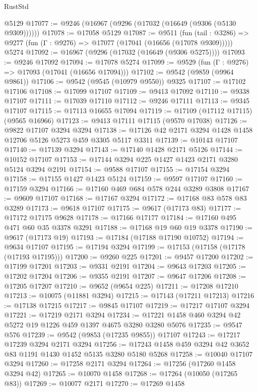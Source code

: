 \begin{lexlean}{RustStd}
\begin{coremodule}
    @5129
@17077 := @9246 (@16967 (@9296 (@17032 (@16649 (@9306 (@5130 @9309))))))
@17078 := @17058 @5129
@17087 := @9511
    (fun (tail : @3286) => @9277 (fun (Γ : @9276) => @17077 (@17041 (@16656 (@17078 @9309)))))
    @5274
@17092 := @16967 (@9296 (@17032 (@16649 (@9306 @5275))))
@17093 := @9246 @17092
@17094 := @17078 @5274
@17099 := @9529 (fun (Γ : @9276) => @17093 (@17041 (@16656 @17094)))
@17102 := @9542 (@9859 (@9964 @9861))
@17106 := @9542 (@9545 (@10979 @9550)) @9325
@17107 := @17102 @17106
@17108 := @17099 @17107
@17109 := @9413 @17092
@17110 := @9338 @17107
@17111 := @17039 @17110
@17112 := @9246 @17111
@17113 := @9345 @17107
@17115 := @17113 @16655 @17094
@17119 := @17109 (@17112 @17115) (@9565 @16966)
@17123 := @9413 @17111 @17115 (@9570 @17038)
@17126 := @9822 @17107 @3294 @3294
@17138 := @17126 @42 @2171 @3294 @1428 @1458 @12706 @5126 @5273 @459 @3305 @5117 @3311
@17139 := @10143 @17107
@17140 := @17139 @3294
@17143 := @17140 @1428 @2171 @5126
@17144 := @10152 @17107
@17153 := @17144 @3294 @225 @1427 @1423 @2171 @3280 @5124 @3294 @2191
@17154 := @9588 @17107
@17155 := @17154 @3294
@17158 := @17155 @1427 @1423 @5124
@17159 := @9597 @17107
@17160 := @17159 @3294
@17166 := @17160 @469 @684 @578 @244 @3289 @3808
@17167 := @9609 @17107
@17168 := @17167 @3294
@17172 := @17168 @83 @578 @83 @3289
@17173 := @9618 @17107
@17175 := @9617 (@17173 @83)
@17177 := @17172 @17175 @9628
@17178 := @17166 @17177
@17184 := @17160 @495 @471 @60 @35 @3378 @3291
@17188 := @17168 @19 @60 @19 @3378
@17190 := @9617 (@17173 @19)
@17193 := @17184 (@17188 @17190 @10752)
@17194 := @9634 @17107
@17195 := @17194 @3294
@17199 := @17153 (@17158 (@17178 (@17193 @17195)))
@17200 := @9260 @225
@17201 := @9457 @17200
@17202 := @17199 @17201
@17203 := @9331 @2191
@17204 := @9643 @17203
@17205 := @17202 @17204
@17206 := @9355 @2191
@17207 := @9647 @17206
@17208 := @17205 @17207
@17210 := @9652 (@9654 @225)
@17211 := @17208 @17210
@17213 := @10075 (@11881 @3294)
@17215 := @17143 (@17211 @17213)
@17216 := @17138 @17215
@17217 := @9845 @17107
@17219 := @17217 @17107 @3294
@17221 := @17219 @2171 @3294
@17234 := @17221 @1458 @460 @3294 @42 @5272 @19 @1226 @459 @1397 @4675 @3280 @3280 @5076
@17235 := @9547 @576
@17239 := @9542 (@9853 (@17235 @9855)) @17107
@17243 := @17217 @17239 @3294 @2171 @3294
@17256 := @17243 @1458 @459 @3294 @42 @3652 @83 @1191 @1430 @1452 @5135 @3280 @5180 @5268
@17258 := @10040 @17107 @3294
@17260 := @17258 @2171 @3294
@17264 := @17256 (@17260 @1458 @3294 @42)
@17265 := @10070 @1458
@17268 := @17264 (@10050 (@17265 @83))
@17269 := @10077 @2171
@17270 := @17269 @1458

\end{coremodule}
\end{lexlean}
